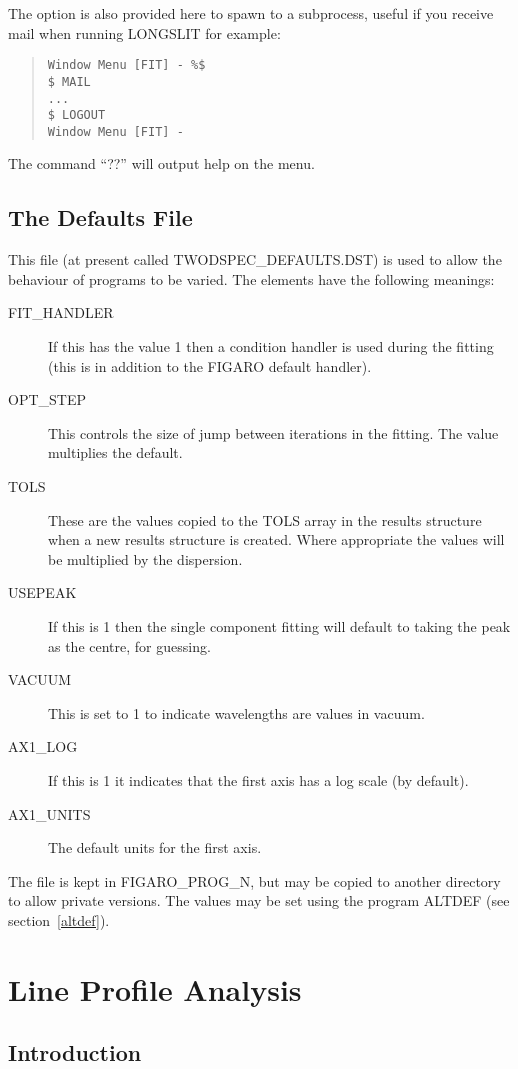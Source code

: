 The option is also provided here to spawn to a subprocess, useful if you
receive mail when running LONGSLIT for example:
\begin{quote}\begin{verbatim}
Window Menu [FIT] - %$
$ MAIL
...
$ LOGOUT
Window Menu [FIT] -
\end{verbatim}\end{quote}
The command ``??'' will output help on the menu.

\subsection{The Defaults File}
\label{deffile}

This file (at present called TWODSPEC\_DEFAULTS.DST) is used to allow
the behaviour of programs to be varied.
The elements have the following meanings:
\begin{description}
\item[FIT\_HANDLER]
If this has the value 1 then a condition handler is used during the
fitting (this is in addition to the FIGARO default handler).
\item[OPT\_STEP]
This controls the size of jump between iterations in the fitting.
The value multiplies the default.
\item[TOLS]
These are the values copied to the TOLS array in the results structure
when a new results structure is created.
Where appropriate the values will be multiplied by the dispersion.
\item[USEPEAK]
If this is 1 then the single component fitting will default to taking
the peak as the centre, for guessing.
\item[VACUUM]
This is set to 1 to indicate wavelengths are values in vacuum.
\item[AX1\_LOG]
If this is 1 it indicates that the first axis has a log scale (by
default).
\item[AX1\_UNITS]
The default units for the first axis.
\end{description}
The file is kept in FIGARO\_PROG\_N, but may be copied to another
directory to allow private versions.
The values may be set using the program ALTDEF (see
section~\ref{altdef}).

\section{Line Profile Analysis}
\subsection{Introduction}

